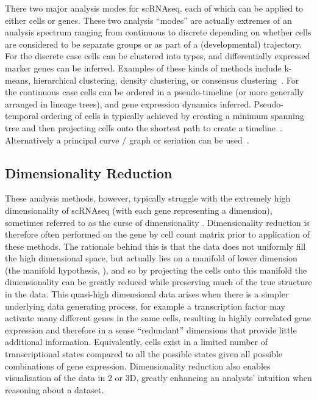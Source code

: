 There two major analysis modes for scRNAseq, each of which can be applied to either cells or genes.
These two analysis ``modes'' are actually extremes of an analysis spectrum ranging from continuous to discrete depending on whether cells are considered to be separate groups or as part of a (developmental) trajectory.
For the discrete case cells can be clustered into types, and differentially expressed marker genes can be inferred.
Examples of these kinds of methods include k-means, hierarchical clustering, density clustering, or consensus clustering~\parencite{Zurauskiene2016pcaReduce,Kiselev2017SC3,Guo2015SINCERA,Satija2015Spatial}.
For the continuous case cells can be ordered in a pseudo-timeline (or more generally arranged in lineage trees), and gene expression dynamics inferred.
Pseudo-temporal ordering of cells is typically achieved by creating a minimum spanning tree and then projecting cells onto the shortest path to create a timeline~\parencite{Trapnell2014dynamics,Ji2016TSCAN}.
Alternatively a principal curve / graph or seriation can be used~\parencite{Marco2014Bifurcation,Qiu2017Reversed}.

\subsection{Dimensionality Reduction}

These analysis methods, however, typically struggle with the extremely high dimensionality of scRNAseq (with each gene representing a dimension), sometimes referred to as the curse of dimensionality \parencite{Donoho2000HighDimensional}.
Dimensionality reduction is therefore often performed on the gene by cell count matrix prior to application of these methods.
The rationale behind this is that the data does not uniformly fill the high dimensional space, but actually lies on a manifold of lower dimension (the manifold hypothesis, \cite{Moon2018Manifold}), and so by projecting the cells onto this manifold the dimensionality can be greatly reduced while preserving much of the true structure in the data.
This quasi-high dimensional data arises when there is a simpler underlying data generating process, for example a transcription factor may activate many different genes in the same cells, resulting in highly correlated gene expression and therefore in a sense ``redundant'' dimensions that provide little additional information.
Equivalently, cells exist in a limited number of transcriptional states compared to all the possible states given all possible combinations of gene expression.
Dimensionality reduction also enables visualisation of the data in 2 or 3D, greatly enhancing an analysts' intuition when reasoning about a dataset.

